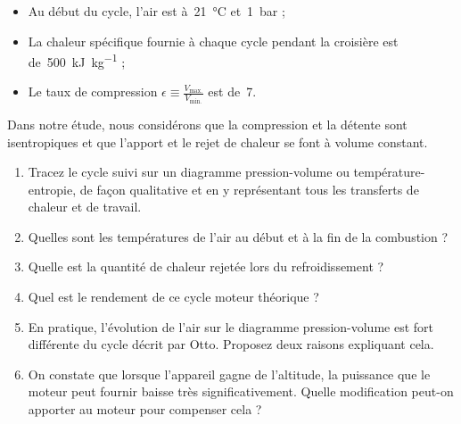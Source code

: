 \begin{figure}
\begin{center}
		\end{center}
		\label{fig_photos_moteur_essence}
	\end{figure}
	
	\begin{itemize}
		\item Au début du cycle, l’air est à~\SI{21}{\degreeCelsius} et~\SI{1}{\bar} ;
		\item La chaleur spécifique fournie à chaque cycle pendant la croisière est de~\SI{500}{\kilo\joule\per\kilogram} ;
		\item Le taux de compression $\epsilon \equiv \frac{V_\text{max.}}{V_\text{min.}}$ est de~\num{7}.
	\end{itemize}

	Dans notre étude, nous considérons que la compression et la détente sont isentropiques et que l’apport et le rejet de chaleur se font à volume constant.

	\begin{enumerate}
		\item Tracez le cycle suivi sur un diagramme pression-volume ou température-entropie, de façon qualitative et en y représentant tous les transferts de chaleur et de travail.
		\item Quelles sont les températures de l’air au début et à la fin de la combustion ?
		\item Quelle est la quantité de chaleur rejetée lors du refroidissement ?
		\item Quel est le rendement de ce cycle moteur théorique ?
		\item En pratique, l’évolution de l’air sur le diagramme pression-volume est fort différente du cycle décrit par Otto. Proposez deux raisons expliquant cela.
		\item On constate que lorsque l’appareil gagne de l’altitude, la puissance que le moteur peut fournir baisse très significativement. Quelle modification peut-on apporter au moteur pour compenser cela ?
	\end{enumerate}


